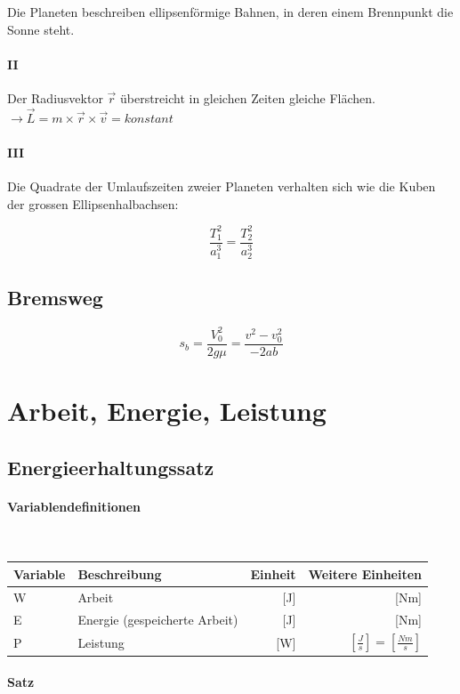 \documentclass[a4paper,10pt]{article}
\newcommand{\lbparagraph}[1]{\paragraph{#1}\mbox{}\\}
\begin{document}
Die Planeten beschreiben ellipsenförmige Bahnen, in deren einem Brennpunkt die Sonne steht.

\paragraph{II}

Der Radiusvektor $\vec{r}$ überstreicht in gleichen Zeiten gleiche Flächen. $\rightarrow \vec{L} = m \times \vec{r} \times \vec{v} = konstant$

\paragraph{III}

Die Quadrate der Umlaufszeiten zweier Planeten verhalten sich wie die Kuben der grossen Ellipsenhalbachsen:

\begin{equation}
    \frac{T_1^2}{a_1^3} = \frac{T_2^2}{a_2^3}
\end{equation}

\subsection{Bremsweg}

\begin{equation}
    s_b = \frac{V_0^2}{2g\mu} = \frac{v^2 - v_0^2}{-2ab}
\end{equation}

\section{Arbeit, Energie, Leistung}

\subsection{Energieerhaltungssatz}

\lbparagraph{Variablendefinitionen}

\begin{tabular}{l|l|r|r}
    Variable & Beschreibung & Einheit & Weitere Einheiten \\
    \hline
    W & Arbeit & [J] & [Nm]  \\
    E & Energie (gespeicherte Arbeit) & [J] & [Nm] \\
    P & Leistung & [W] & $[\frac{J}{s}] = [\frac{Nm}{s}]$
\end{tabular}

\lbparagraph{Satz}
\end{document}
